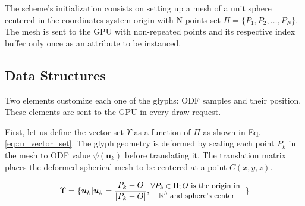 \documentclass[twoside,twocolumn,10pt]{article}
\begin{document}

The scheme's initialization consists on setting up a mesh of a unit sphere centered in the coordinates system origin with N points set $\Pi = \{P_1, P_2, \dots, P_N\}$. The mesh is sent to the GPU with non-repeated points and its respective index buffer only once as an attribute to be instanced.






\subsection{Data Structures}
\label{ssec::datastruct}

Two elements customize each one of the glyphs: ODF samples and their position. These elements are sent to the GPU in every draw request.

First, let us define the vector set $\Upsilon$ as a function of $\Pi$ as shown in Eq. \ref{eq::u_vector_set}. The glyph geometry is deformed by scaling each point $P_k$ in the mesh to ODF value $\psi(\bm{u}_k)$ before translating it. The translation matrix places the deformed spherical mesh to be centered at a point $C(x, y, z)$.

\begin{equation}
\label{eq::u_vector_set}
\Upsilon = \{\bm{u}_k | \bm{u}_k = \frac{P_k - O}{|P_k - O|}, 
\begin{tabular}{@{}c@{}}
\small{$\forall P_k \in \Pi; O$ is the origin in } \\
\small{$\mathbb{R}^3$ and sphere's center}



\end{tabular}
\text{ }\}
\end{equation}

\end{document}
